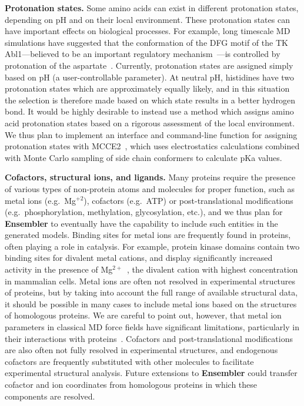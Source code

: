 \documentclass[aps,pre,twocolumn,nofootinbib,superscriptaddress,linenumbers]{revtex4-1}
\begin{document}
{\bf Protonation states.}
Some amino acids can exist in different protonation states, depending on pH and on their local environment.
These protonation states can have important effects on biological processes.
For example, long timescale MD simulations have suggested that the conformation of the DFG motif of the TK Abl1---believed to be an important regulatory mechanism~\cite{nagar:cell:2003:abl-1opl}---is controlled by protonation of the aspartate~\cite{shan:pnas:2009:abl}.
Currently, protonation states are assigned simply based on pH (a user-controllable parameter).
At neutral pH, histidines have two protonation states which are approximately equally likely, and in this situation the selection is therefore made based on which state results in a better hydrogen bond.
It would be highly desirable to instead use a method which assigns amino acid protonation states based on a rigorous assessment of the local environment.
We thus plan to implement an interface and command-line function for assigning protonation states with MCCE2~\cite{alexov-gunner:biophys-j:1997:mcce2,georgescu-alexov-gunner:biophys-j:2002:mcce2,song-mao-gunner:j-comput-chem:2009:mcce2}, which uses electrostatics calculations combined with Monte Carlo sampling of side chain conformers to calculate pKa values.

{\bf Cofactors, structural ions, and ligands.}
Many proteins require the presence of various types of non-protein atoms and molecules for proper function, such as metal ions (e.g.~Mg$^{+2}$), cofactors (e.g.~ATP) or post-translational modifications (e.g.~phosphorylation, methylation, glycosylation, etc.), and we thus plan for {\bf Ensembler} to eventually have the capability to include such entities in the generated models.
Binding sites for metal ions are frequently found in proteins, often playing a role in catalysis.
For example, protein kinase domains contain two binding sites for divalent metal cations, and display significantly increased activity in the presence of Mg$^{2+}$~\cite{adams:prot-sci:1993:kinase-metal-ions}, the divalent cation with highest concentration in mammalian cells.
Metal ions are often not resolved in experimental structures of proteins, but by taking into account the full range of available structural data, it should be possible in many cases to include metal ions based on the structures of homologous proteins.
We are careful to point out, however, that metal ion parameters in classical MD force fields have significant limitations, particularly in their interactions with proteins~\cite{sousa:book:2010:metal-ion-parameters-difficulties}.
Cofactors and post-translational modifications are also often not fully resolved in experimental structures, and endogenous cofactors are frequently substituted with other molecules to facilitate experimental structural analysis.
Future extensions to {\bf Ensembler} could transfer cofactor and ion coordinates from homologous proteins in which these components are resolved.
\end{document}
